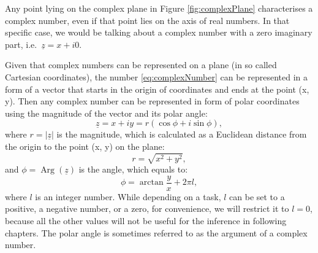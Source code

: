 \documentclass[
]{book}
\DeclareMathOperator\Arg{Arg}
\begin{document}
Any point lying on the complex plane in Figure \ref{fig:complexPlane} characterises a complex number, even if that point lies on the axis of real numbers. In that specific case, we would be talking about a complex number with a zero imaginary part, i.e.~\(\underline{z}=x+i0\).

Given that complex numbers can be represented on a plane (in so called Cartesian coordinates), the number \eqref{eq:complexNumber} can be represented in a form of a vector that starts in the origin of coordinates and ends at the point (x, y). Then any complex number can be represented in form of polar coordinates using the magnitude of the vector and its polar angle:
\begin{equation}
    \underline{z} = x+iy = r (\cos \phi + i \sin \phi),
    \label{eq:complexNumberTrigonometric}
\end{equation}
where \(r=|\underline{z}|\) is the magnitude, which is calculated as a Euclidean distance from the origin to the point (x, y) on the plane:
\begin{equation}
    r = \sqrt{x^2 + y^2},
    \label{eq:complexNumberMagnitude}
\end{equation}
and \(\phi=\Arg(\underline{z})\) is the angle, which equals to:
\begin{equation}
    \phi = \arctan \frac{y}{x} + 2 \pi l,
    \label{eq:complexNumberAngle}
\end{equation}
where \(l\) is an integer number. While depending on a task, \(l\) can be set to a positive, a negative number, or a zero, for convenience, we will restrict it to \(l=0\), because all the other values will not be useful for the inference in following chapters. The polar angle is sometimes referred to as the argument of a complex number.
\end{document}
